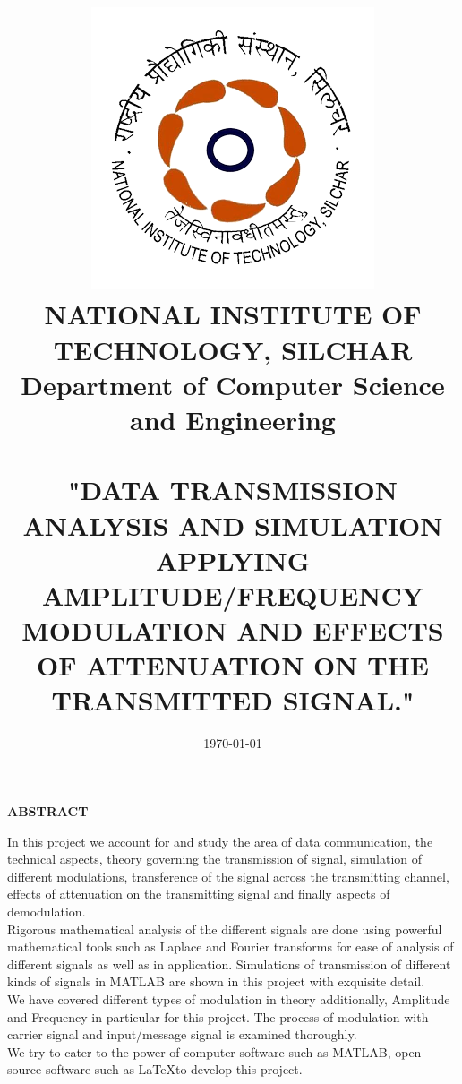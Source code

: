 \documentclass[12pt,a4paper]{article}%
\begin{document}
	
	
	\begin{titlepage}
	\title{\includegraphics[width=0.38 \textwidth]{./images/NIT_Silchar_logo.png}\\\textbf{\large NATIONAL INSTITUTE OF TECHNOLOGY, SILCHAR}\\\textbf{{\large Department of Computer Science and Engineering}}\\\\\bigskip\textbf{{\normalsize "DATA TRANSMISSION ANALYSIS AND SIMULATION APPLYING AMPLITUDE/FREQUENCY MODULATION AND EFFECTS OF ATTENUATION ON THE TRANSMITTED SIGNAL." }}}
	\date{\today}
	\clearpage\maketitle
	\thispagestyle{empty}
	\end{titlepage}
	
	\begin{center}
		\textbf{\large ABSTRACT}
	\end{center}
    \begin{flushleft}
    	\fontsize{12pt}{18pt}\selectfont
    	 In this project we account for and study the area of data communication, the technical aspects, theory governing the transmission of signal, simulation of different modulations, transference of the signal across the transmitting channel, effects of attenuation on the transmitting signal and finally aspects of demodulation.\\\bigskip
    	 Rigorous mathematical analysis of the different signals are done using powerful mathematical tools such as Laplace and Fourier transforms for ease of analysis of
    	 different signals as well as in application. Simulations of transmission of different kinds of signals in MATLAB are shown in this project with exquisite detail.\\\bigskip
    	 We have covered different types of modulation in theory additionally, Amplitude and Frequency in particular for this project. The process of modulation with carrier signal
    	 and input/message signal is examined thoroughly.\\\bigskip
    	 We try to cater to the power of computer software such as MATLAB, open source software such as \LaTeX to develop this project.
	\end{flushleft}
	
\end{document}
